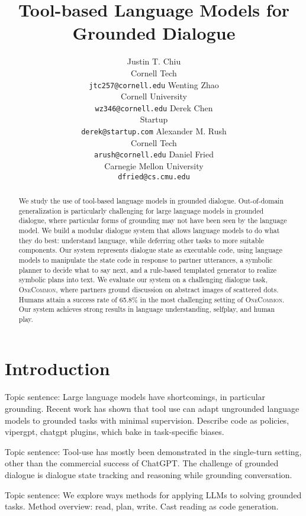 \documentclass[11pt]{article}
\title{Tool-based Language Models for Grounded Dialogue}
\author{
Justin T. Chiu  \\
Cornell Tech \\
\texttt{jtc257@cornell.edu}
\And
Wenting Zhao \\
Cornell University \\
\texttt{wz346@cornell.edu}
\And
Derek Chen \\
Startup \\
\texttt{derek@startup.com}
\And
Alexander M. Rush \\
Cornell Tech \\
\texttt{arush@cornell.edu}
\And
Daniel Fried \\
Carnegie Mellon University \\
\texttt{dfried@cs.cmu.edu} 
}
\begin{document}
\maketitle
\begin{abstract}

We study the use of tool-based language models in grounded dialogue.
Out-of-domain generalization is particularly challenging for large language models in grounded dialogue,
where particular forms of grounding may not have been seen by the language model.
We build a modular dialogue system that allows language models to do what they do best:
understand language, while deferring other tasks to more suitable components.
Our system represents dialogue state as executable code,
using language models to manipulate the state code in response to partner utterances,
a symbolic planner to decide what to say next,
and a rule-based templated generator to realize symbolic plans into text.
We evaluate our system on a challenging dialogue task, \textsc{OneCommon},
where partners ground discussion on abstract images of scattered dots.
Humans attain a success rate of 65.8\% in the most challenging setting of \textsc{OneCommon}.
Our system achieves strong results in language understanding,
selfplay, and human play.
\end{abstract}


\section{Introduction}
Topic sentence: Large language models have shortcomings, in particular grounding.
Recent work has shown that tool use can adapt ungrounded language models
to grounded tasks with minimal supervision.
Describe code as policies, vipergpt, chatgpt plugins,
which bake in task-specific biases.

Topic sentence: Tool-use has mostly been demonstrated in the single-turn setting,
other than the commercial success of ChatGPT.
The challenge of grounded dialogue is dialogue state tracking and reasoning while
grounding conversation.

Topic sentence: We explore ways methods for applying LLMs to solving grounded tasks.
Method overview: read, plan, write.
Cast reading as code generation.
\end{document}
